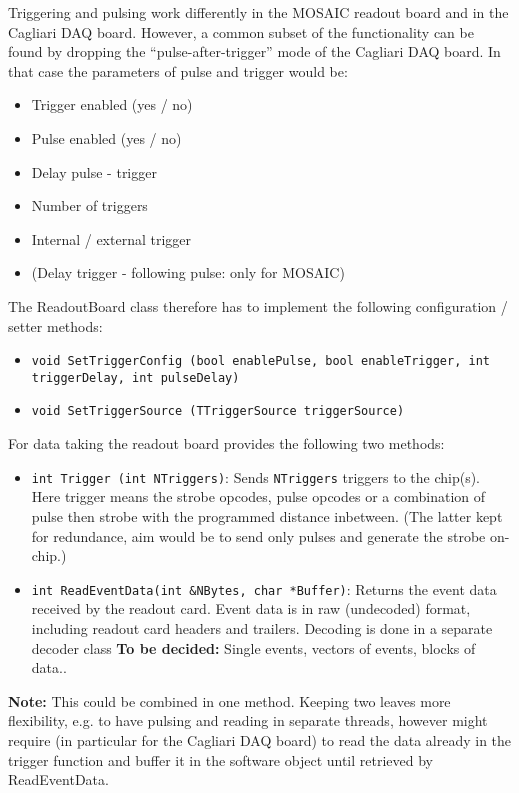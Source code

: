\documentclass{article}
\begin{document}
Triggering and pulsing work differently in the MOSAIC readout board
and in the Cagliari DAQ board. However, a common subset of the
functionality can be found by dropping the ``pulse-after-trigger''
mode of the Cagliari DAQ board. In that case the parameters of pulse
and trigger would be: 
\begin{itemize}
\item Trigger enabled (yes / no)
\item Pulse enabled (yes / no)
\item Delay pulse - trigger 
\item Number of triggers
\item Internal / external trigger
\item (Delay trigger - following pulse: only for MOSAIC)
\end{itemize}

The ReadoutBoard class therefore has to implement the following
configuration / setter methods: 

\begin{itemize}
\item \texttt{void SetTriggerConfig (bool enablePulse, bool
  enableTrigger, int triggerDelay, int pulseDelay)}
\item \texttt{void SetTriggerSource (TTriggerSource triggerSource)}
\end{itemize}


For data taking the readout board provides the following two methods: 

\begin{itemize}
\item \texttt{int Trigger (int NTriggers)}: Sends \texttt{NTriggers}
  triggers to the chip(s). Here trigger means the strobe opcodes,
  pulse opcodes or a combination of pulse then strobe with the
  programmed distance inbetween. (The latter kept for redundance,
  aim would be to send only pulses and generate the strobe on-chip.)
\item \texttt{int ReadEventData(int \&NBytes, char *Buffer)}: Returns
  the event data received by the readout card. Event data is in raw
  (undecoded) format, including readout card headers and
  trailers. Decoding is done in a separate decoder class \textbf{To be
    decided:} Single events, vectors of events, blocks of data.. 
\end{itemize}

\textbf{Note:} This could be combined in one method. Keeping two leaves more
flexibility, e.g. to have pulsing and reading in separate threads,
however might require (in particular for the Cagliari DAQ board) to
read the data already in the trigger function and buffer it in the
software object until retrieved by ReadEventData.
\end{document}
